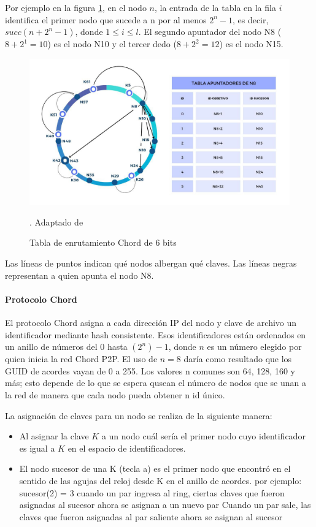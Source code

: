  Por   ejemplo en la figura \ref{fig:chord-te}, en el nodo $n$, la entrada de la tabla en la fila $i$ identifica el primer nodo que sucede a n por al menos $2^{n}-1$, es decir, $succ(n + 2^{n}-1)$, donde $1 \leq i \leq l$. El segundo apuntador del nodo N8 ($8+2^{1}= 10$) es el nodo N10 y el tercer dedo ($8+2^{2}= 12$)   es el nodo N15. 


\begin{figure}%
		\includegraphics {10/3.jpg } 
	\caption{Tabla de enrutamiento Chord de 6 bits}
	\label{fig:chord-te}. Adaptado de \cite{Goetz2005}
\end{figure}
 
 Las líneas de puntos indican qué nodos albergan qué claves. Las líneas negras representan a quien apunta el nodo N8.

\paragraph{Protocolo Chord}
El protocolo Chord asigna a cada dirección IP del nodo y clave de archivo un identificador mediante hash consistente. Esos identificadores están ordenados en un anillo de números del $0$ hasta $(2^{n})-1$,  donde $n$ es un número elegido por quien inicia la red Chord P2P. El uso de $n = 8$ daría como resultado que los GUID de acordes vayan de 0 a 255. Los valores n comunes son 64, 128, 160 y más; esto depende de lo que se espera qusean el n\'umero de nodos que se unan a la red de manera que cada nodo pueda obtener n id \'unico. 
  
  

La asignación de claves para un nodo se realiza de la siguiente manera:

\begin{itemize}
	\item Al asignar la clave $K$ a un nodo cuál sería el primer nodo cuyo identificador es igual a $K$  en el espacio de identificadores.
	\item El nodo sucesor de una K (tecla a) es el primer nodo que encontró en el sentido de las agujas del reloj desde K en el anillo de acordes.
	por ejemplo: sucesor(2) = 3
	cuando un par ingresa al ring, ciertas claves que fueron asignadas al sucesor ahora se asignan a un nuevo par
	Cuando un par sale, las claves que fueron asignadas al par saliente ahora se asignan al sucesor
\end{itemize}



